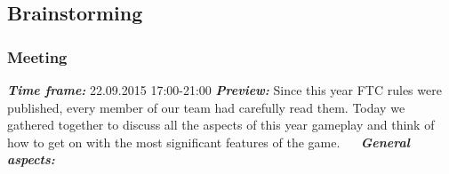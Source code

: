 \subsection{Brainstorming}

\addtocounter{number_of_meeting}{1}
\subsubsection{ Meeting}
	\textit{\textbf{Time frame:}} 22.09.2015 17:00-21:00 \newline
	\textit{\textbf{Preview:}} Since this year FTC rules were published, every member of our team had carefully read them. Today we gathered together to discuss all the aspects of this year gameplay and think of how to get on with the most significant features of the game. \newline
	 \newline
	\textit{\textbf{General aspects:}}
